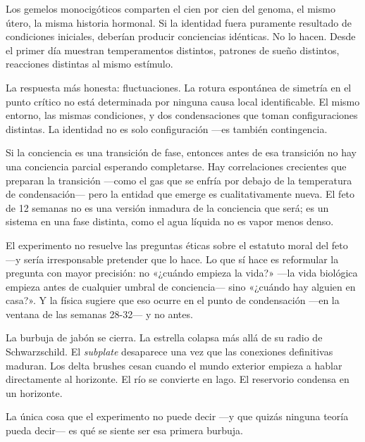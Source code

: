 Los gemelos monocigóticos comparten el cien por cien del genoma, el mismo útero, la misma historia hormonal. Si la identidad fuera puramente resultado de condiciones iniciales, deberían producir conciencias idénticas. No lo hacen. Desde el primer día muestran temperamentos distintos, patrones de sueño distintos, reacciones distintas al mismo estímulo.

La respuesta más honesta: fluctuaciones. La rotura espontánea de simetría en el punto crítico no está determinada por ninguna causa local identificable. El mismo entorno, las mismas condiciones, y dos condensaciones que toman configuraciones distintas. La identidad no es solo configuración —es también contingencia.

\noindent Si la conciencia es una transición de fase, entonces antes de esa transición no hay una conciencia parcial esperando completarse. Hay correlaciones crecientes que preparan la transición —como el gas que se enfría por debajo de la temperatura de condensación— pero la entidad que emerge es cualitativamente nueva. El feto de 12 semanas no es una versión inmadura de la conciencia que será; es un sistema en una fase distinta, como el agua líquida no es vapor menos denso.

El experimento no resuelve las preguntas éticas sobre el estatuto moral del feto —y sería irresponsable pretender que lo hace. Lo que sí hace es reformular la pregunta con mayor precisión: no «¿cuándo empieza la vida?» —la vida biológica empieza antes de cualquier umbral de conciencia— sino «¿cuándo hay alguien en casa?». Y la física sugiere que eso ocurre en el punto de condensación —en la ventana de las semanas 28-32— y no antes.

La burbuja de jabón se cierra. La estrella colapsa más allá de su radio de Schwarzschild. El \emph{subplate} desaparece una vez que las conexiones definitivas maduran. Los delta brushes cesan cuando el mundo exterior empieza a hablar directamente al horizonte. El río se convierte en lago. El reservorio condensa en un horizonte.

La única cosa que el experimento no puede decir —y que quizás ninguna teoría pueda decir— es qué se siente ser esa primera burbuja.

